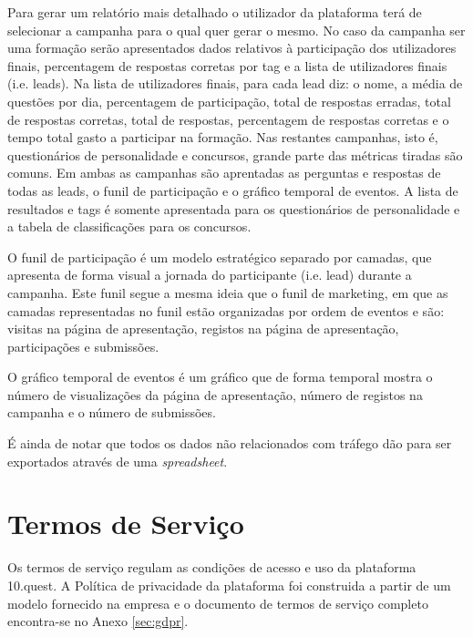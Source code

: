 Para gerar um relatório mais detalhado o utilizador da plataforma terá de selecionar a campanha para o qual quer gerar o mesmo. No caso da campanha ser uma formação serão apresentados dados relativos à participação dos utilizadores finais, percentagem de respostas corretas por tag e a lista de utilizadores finais (i.e. leads). Na lista de utilizadores finais, para cada lead diz: o nome, a média de questões por dia, percentagem de participação, total de respostas erradas, total de respostas corretas, total de respostas, percentagem de respostas corretas e o tempo total gasto a participar na formação. 
Nas restantes campanhas, isto é, questionários de personalidade e concursos, grande parte das métricas tiradas são comuns. Em ambas as campanhas são aprentadas as perguntas e respostas de todas as leads, o funil de participação e o gráfico temporal de eventos. A lista de resultados e tags é somente apresentada para os questionários de personalidade e a tabela de classificações para os concursos. 

O funil de participação é um modelo estratégico separado por camadas, que apresenta de forma visual a jornada do participante (i.e. lead) durante a campanha. Este funil segue a mesma ideia que o funil de marketing\cite{f8}\cite{f9}, em que as camadas representadas no funil estão organizadas por ordem de eventos e são: visitas na página de apresentação, registos na página de apresentação, participações e submissões.

O gráfico temporal de eventos é um gráfico que de forma temporal mostra o número de visualizações da página de apresentação, número de registos na campanha e o número de submissões.

É ainda de notar que todos os dados não relacionados com tráfego dão para ser exportados através de uma \textit{spreadsheet}.


\section{Termos de Serviço}

Os termos de serviço regulam as condições de acesso e uso da plataforma 10.quest. A Política de privacidade da plataforma foi construida a partir de um modelo fornecido na empresa e o documento de termos de serviço completo encontra-se no Anexo \ref{sec:gdpr}.

